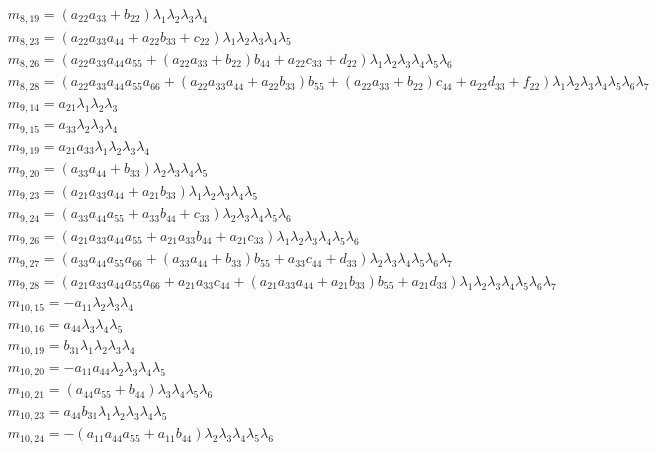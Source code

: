 \documentclass{article}
\begin{document}
\begin{align*}
&m_{8,19}={\left(a_{22} a_{33} + b_{22}\right)} \lambda_{1} \lambda_{2} \lambda_{3} \lambda_{4}\\
&m_{8,23}={\left(a_{22} a_{33} a_{44} + a_{22} b_{33} + c_{22}\right)} \lambda_{1} \lambda_{2} \lambda_{3} \lambda_{4} \lambda_{5}\\
&m_{8,26}={\left(a_{22} a_{33} a_{44} a_{55} + {\left(a_{22} a_{33} + b_{22}\right)} b_{44} + a_{22} c_{33} + d_{22}\right)} \lambda_{1} \lambda_{2} \lambda_{3} \lambda_{4} \lambda_{5} \lambda_{6}\\
&m_{8,28}={\left(a_{22} a_{33} a_{44} a_{55} a_{66} + {\left(a_{22} a_{33} a_{44} + a_{22} b_{33}\right)} b_{55} + {\left(a_{22} a_{33} + b_{22}\right)} c_{44} + a_{22} d_{33} + f_{22}\right)} \lambda_{1} \lambda_{2} \lambda_{3} \lambda_{4} \lambda_{5} \lambda_{6} \lambda_{7}\\
&m_{9,14}=a_{21} \lambda_{1} \lambda_{2} \lambda_{3}\\
&m_{9,15}=a_{33} \lambda_{2} \lambda_{3} \lambda_{4}\\
&m_{9,19}=a_{21} a_{33} \lambda_{1} \lambda_{2} \lambda_{3} \lambda_{4}\\
&m_{9,20}={\left(a_{33} a_{44} + b_{33}\right)} \lambda_{2} \lambda_{3} \lambda_{4} \lambda_{5}\\
&m_{9,23}={\left(a_{21} a_{33} a_{44} + a_{21} b_{33}\right)} \lambda_{1} \lambda_{2} \lambda_{3} \lambda_{4} \lambda_{5}\\
&m_{9,24}={\left(a_{33} a_{44} a_{55} + a_{33} b_{44} + c_{33}\right)} \lambda_{2} \lambda_{3} \lambda_{4} \lambda_{5} \lambda_{6}\\
&m_{9,26}={\left(a_{21} a_{33} a_{44} a_{55} + a_{21} a_{33} b_{44} + a_{21} c_{33}\right)} \lambda_{1} \lambda_{2} \lambda_{3} \lambda_{4} \lambda_{5} \lambda_{6}\\
&m_{9,27}={\left(a_{33} a_{44} a_{55} a_{66} + {\left(a_{33} a_{44} + b_{33}\right)} b_{55} + a_{33} c_{44} + d_{33}\right)} \lambda_{2} \lambda_{3} \lambda_{4} \lambda_{5} \lambda_{6} \lambda_{7}\\
&m_{9,28}={\left(a_{21} a_{33} a_{44} a_{55} a_{66} + a_{21} a_{33} c_{44} + {\left(a_{21} a_{33} a_{44} + a_{21} b_{33}\right)} b_{55} + a_{21} d_{33}\right)} \lambda_{1} \lambda_{2} \lambda_{3} \lambda_{4} \lambda_{5} \lambda_{6} \lambda_{7}\\
&m_{10,15}=-a_{11} \lambda_{2} \lambda_{3} \lambda_{4}\\
&m_{10,16}=a_{44} \lambda_{3} \lambda_{4} \lambda_{5}\\
&m_{10,19}=b_{31} \lambda_{1} \lambda_{2} \lambda_{3} \lambda_{4}\\
&m_{10,20}=-a_{11} a_{44} \lambda_{2} \lambda_{3} \lambda_{4} \lambda_{5}\\
&m_{10,21}={\left(a_{44} a_{55} + b_{44}\right)} \lambda_{3} \lambda_{4} \lambda_{5} \lambda_{6}\\
&m_{10,23}=a_{44} b_{31} \lambda_{1} \lambda_{2} \lambda_{3} \lambda_{4} \lambda_{5}\\
&m_{10,24}=-{\left(a_{11} a_{44} a_{55} + a_{11} b_{44}\right)} \lambda_{2} \lambda_{3} \lambda_{4} \lambda_{5} \lambda_{6}\\
\end{align*}
\end{document}
